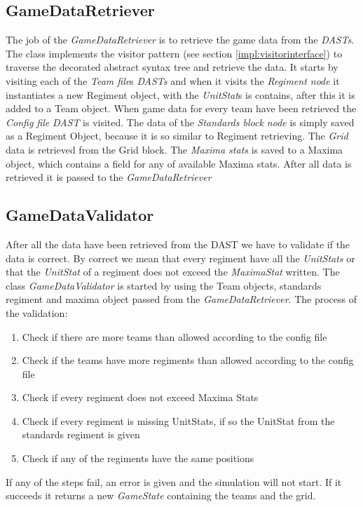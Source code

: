 \subsection{GameDataRetriever}
	The job of the {\it GameDataRetriever} is to retrieve the game data from the {\it DASTs}. The class implements the visitor pattern
	(see section \ref{impl:visitorinterface}) to traverse the decorated abstract syntax tree and retrieve the data. 
	It starts by visiting each of the {\it Team file}s {\it DASTs} and when it visits the {\it Regiment node} it instantiates a new Regiment object, 
	with the {\it UnitStat}s is contains, after this it is added to a Team object. When game data for every team have been retrieved the {\it Config file}
	{\it DAST} is visited. The data of the {\it Standards block node} is simply saved as a Regiment Object, because it is so similar to Regiment retrieving. 
	The {\it Grid} data is retrieved from the Grid block. The {\it Maxima stats} is saved to a Maxima object, which contains a field for any of available 
	Maxima stats. After all data is retrieved it is passed to the {\it GameDataRetriever}

\subsection{GameDataValidator}\label{sec:gdv}
	After all the data have been retrieved from the DAST we have to validate if the data is correct. 
	By correct we mean that every regiment have all the {\it UnitStats} or that the {\it UnitStat} 
	of a regiment does not exceed the {\it MaximaStat} written. 
	The class {\it GameDataValidator} is started by using the Team objects, standards regiment and maxima object passed from the {\it GameDataRetriever}.
	The process of the validation: \\
	\begin{enumerate}
		\item Check if there are more teams than allowed according to the config file
		\item Check if the teams have more regiments than allowed according to the config file
		\item Check if every regiment does not exceed Maxima Stats
		\item Check if every regiment is missing UnitStats, if so the UnitStat from the standards regiment is given
		\item Check if any of the regiments have the same positions
	\end{enumerate}
	If any of the steps fail, an error is given and the simulation will not start. If it succeeds it returns a new {\it GameState} containing the teams 
	and the grid.
	
